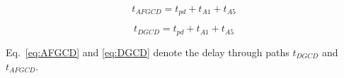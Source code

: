 \begin{equation}\label{eq:AFGCD}
    t_{AFGCD} = t_{pd} + t_{A1} + t_{A5}
\end{equation}

\begin{equation}\label{eq:DGCD}
    t_{DGCD} = t_{pd} + t_{A1} + t_{A5}
\end{equation}

Eq.~\ref{eq:AFGCD} and \ref{eq:DGCD} denote the delay through paths $t_{DGCD}$ and $t_{AFGCD}$.